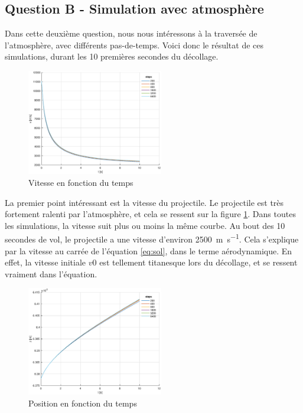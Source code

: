 \documentclass[a4paper,12pt,twoside]{article}
\begin{document}
\subsection{Question B - Simulation avec atmosphère}
Dans cette deuxième question, nous nous intéressons à la traversée de l'atmosphère, avec différents pas-de-temps. Voici donc le résultat de ces simulations, durant les 10 premières secondes du décollage.\\

\begin{figure}[h]
	\centering
    \includegraphics[width=0.53\textwidth]{graphs/vB.eps}
    \caption{Vitesse en fonction du temps}
    \label{fig:B-vt}
\end{figure}

La premier point intéressant est la vitesse du projectile. Le projectile est très fortement ralenti par l'atmosphère, et cela se ressent sur la figure \ref{fig:B-vt}. Dans toutes les simulations, la vitesse suit plus ou moins la même courbe. Au bout des 10 secondes de vol, le projectile a une vitesse d'environ \SI{2500}{\meter\per\second}. Cela s'explique par la vitesse au carrée de l'équation \ref{eq:sol}, dans le terme aérodynamique. En effet, la vitesse initiale $v0$ est tellement titanesque lors du décollage, et se ressent vraiment dans l'équation.\\


\begin{figure}[h]
	\centering
	\includegraphics[width=0.53\textwidth]{graphs/zB.eps}
	\caption{Position en fonction du temps}
	\label{fig:B-zt}
\end{figure}
\end{document}
